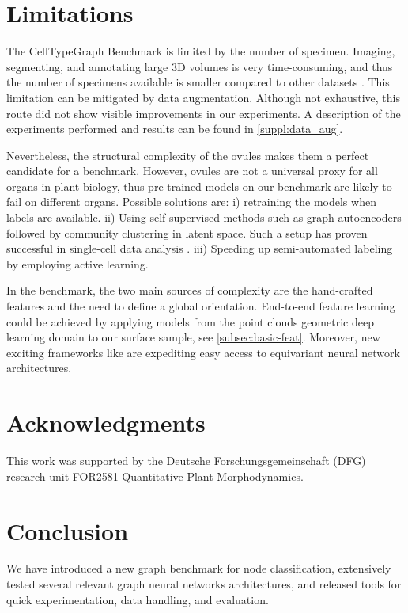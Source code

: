 \documentclass[10pt,twocolumn,letterpaper]{article}
\begin{document}
\section{Limitations}
\label{sec:limitations}
The CellTypeGraph Benchmark is limited by the number of specimen. Imaging, segmenting, and annotating large 3D volumes is very time-consuming, and thus the number of specimens available is smaller compared to other datasets \cite{wu2018moleculenet, gomez2018automatic}. This limitation can be mitigated by data augmentation. Although not exhaustive, this route did not show visible improvements in our experiments. A description of the experiments performed and results can be found in \cref{suppl:data_aug}.

Nevertheless, the structural complexity of the ovules makes them a perfect candidate for a benchmark. However, ovules are not a universal proxy for all organs in plant-biology, thus pre-trained models on our benchmark are likely to fail on different organs. Possible solutions are: i) retraining the models when labels are available. ii) Using self-supervised methods such as graph autoencoders \cite{kipf2016variational, salehi2020graph} followed by community clustering in latent space. Such a setup has proven successful in single-cell data analysis \cite{amodio2019exploring, lopez2017deep}. iii) Speeding up semi-automated labeling by employing active learning.

In the benchmark, the two main sources of complexity are the hand-crafted features and the need to define a global orientation. End-to-end feature learning could be achieved by applying models from the point clouds geometric deep learning domain \cite{qi2017pointnet, qi2017pointnet++, li2018pointcnn} to our surface sample, see \cref{subsec:basic-feat}. Moreover, new exciting frameworks like \cite{e3nn} are expediting easy access to equivariant neural network architectures.

\section{Acknowledgments}
This work was supported by the Deutsche Forschungsgemeinschaft (DFG) research unit FOR2581 Quantitative Plant
Morphodynamics.

\section{Conclusion}
We have introduced a new graph benchmark for node classification, extensively tested several relevant graph neural networks architectures, and released tools for quick experimentation, data handling, and evaluation.
\end{document}
